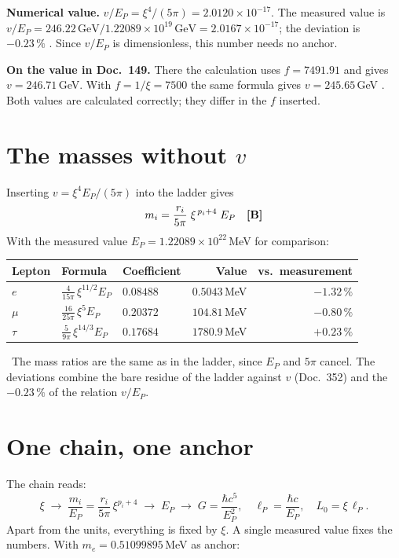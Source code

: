 \textbf{Numerical value.} $v/E_P=\xi^4/(5\pi)=2.0120\times10^{-17}$. The measured value
is $v/E_P=246.22\,\text{GeV}/1.22089\times10^{19}\,\text{GeV}=2.0167\times10^{-17}$;
the deviation is $-0.23\,\%$ \KM. Since $v/E_P$ is dimensionless, this number needs no
anchor.

\textbf{On the value in Doc.~149.} There the calculation uses $f=7491.91$ and gives
$v=246.71$\,GeV. With $f=1/\xi=7500$ the same formula gives $v=245.65$\,GeV \KM. Both
values are calculated correctly; they differ in the $f$ inserted.

\section{The masses without \texorpdfstring{$v$}{v}}
Inserting $v=\xi^4E_P/(5\pi)$ into the ladder gives
\begin{equation}
  m_i=\frac{r_i}{5\pi}\;\xi^{\,p_i+4}\;E_P\quad\textbf{[B]}
\end{equation}
With the measured value $E_P=1.22089\times10^{22}$\,MeV for comparison:

\begin{center}
\begin{tabular}{@{}lllrr@{}}
\toprule
\textbf{Lepton} & \textbf{Formula} & \textbf{Coefficient} & \textbf{Value} & \textbf{vs.\ measurement}\\
\midrule
$e$    & $\frac{4}{15\pi}\,\xi^{11/2}E_P$ & $0.08488$ & $0.5043$\,MeV  & $-1.32\,\%$\\[3pt]
$\mu$  & $\frac{16}{25\pi}\,\xi^{5}E_P$   & $0.20372$ & $104.81$\,MeV  & $-0.80\,\%$\\[3pt]
$\tau$ & $\frac{5}{9\pi}\,\xi^{14/3}E_P$ & $0.17684$ & $1780.9$\,MeV  & $+0.23\,\%$\\
\bottomrule
\end{tabular}
\end{center}
\KM\ The mass ratios are the same as in the ladder, since $E_P$ and $5\pi$ cancel. The
deviations combine the bare residue of the ladder against $v$ (Doc.~352) and the
$-0.23\,\%$ of the relation $v/E_P$.

\section{One chain, one anchor}
The chain reads:
\begin{equation}
  \xi\;\longrightarrow\;\frac{m_i}{E_P}=\frac{r_i}{5\pi}\,\xi^{p_i+4}
  \;\longrightarrow\;E_P\;\longrightarrow\;
  G=\frac{\hbar c^5}{E_P^2},\quad
  \ell_P=\frac{\hbar c}{E_P},\quad
  L_0=\xi\,\ell_P .
\end{equation}
Apart from the units, everything is fixed by $\xi$. A single measured value fixes the
numbers. With $m_e=0.51099895$\,MeV as anchor:

